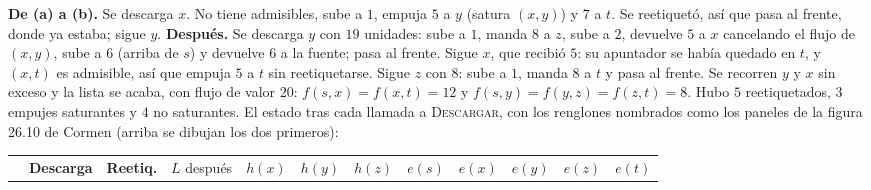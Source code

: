 \documentclass[11pt,letterpaper]{article}
\begin{document}
\begin{ejemplo}
\begin{center}
  \end{center}
  \textbf{De (a) a (b).} Se descarga $x$. No tiene admisibles, sube a
  $1$, empuja $5$ a $y$ (satura $(x, y)$) y $7$ a $t$. Se reetiquetó,
  así que pasa al frente, donde ya estaba; sigue $y$.
  \textbf{Después.} Se descarga $y$ con $19$ unidades: sube a $1$,
  manda $8$ a $z$, sube a $2$, devuelve $5$ a $x$ cancelando el flujo
  de $(x, y)$, sube a $6$ (arriba de $s$) y devuelve $6$ a la fuente;
  pasa al frente. Sigue $x$, que recibió $5$: su apuntador se había
  quedado en $t$, y $(x, t)$ es admisible, así que empuja $5$ a $t$ sin
  reetiquetarse. Sigue $z$ con $8$: sube a $1$, manda $8$ a $t$ y pasa
  al frente. Se recorren $y$ y $x$ sin exceso y la lista se acaba, con
  flujo de valor $20$: $f(s, x) = f(x, t) = 12$ y
  $f(s, y) = f(y, z) = f(z, t) = 8$. Hubo $5$ reetiquetados, $3$
  empujes saturantes y $4$ no saturantes. El estado tras cada llamada
  a \textsc{Descargar}, con los renglones nombrados como los paneles
  de la figura 26.10 de Cormen (arriba se dibujan los dos primeros):
  \begin{center}
  \small
  \setlength{\tabcolsep}{4.5pt}
  \begin{tabular}{clcccccccccc}
    \toprule
    & \textbf{Descarga} & \textbf{Reetiq.} & $L$ después
      & $h(x)$ & $h(y)$ & $h(z)$ & $e(s)$ & $e(x)$ & $e(y)$ & $e(z)$
      & $e(t)$ \\

\end{tabular}
\end{center}
\end{ejemplo}
\end{document}
